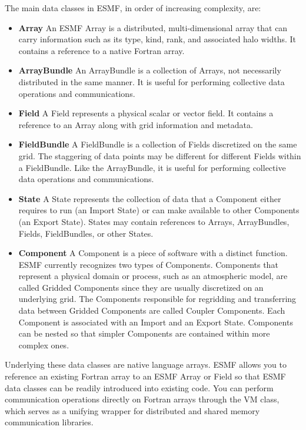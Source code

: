 The main data classes in ESMF, in order of increasing complexity, are:
\begin{itemize}
\item {\bf Array} An ESMF Array is a distributed, multi-dimensional 
array that can carry information such as its type, kind, rank, and 
associated halo widths.  It contains a reference to a native Fortran array.
\item {\bf ArrayBundle}  An ArrayBundle is a collection of Arrays, not
necessarily distributed in the same manner.  It is useful for performing
collective data operations and communications. 
\item {\bf Field}  A Field represents a physical scalar or vector field.
It contains a reference to an Array along with grid information and metadata.
\item {\bf FieldBundle}  A FieldBundle is a collection of Fields discretized 
on the same grid.  The staggering of data points may be different for 
different Fields within a FieldBundle.  Like the ArrayBundle, it is
useful for performing collective data operations and
communications.
\item {\bf State}  A State represents the collection of data that a 
Component either requires to run (an Import State) or can make 
available to other Components (an Export State).
States may contain references to Arrays, ArrayBundles, Fields,
FieldBundles, or other States. 
\item {\bf Component}  A Component is a piece of software 
with a distinct function.  ESMF currently recognizes two types 
of Components.  Components that represent a physical domain 
or process, such 
as an atmospheric model, are called Gridded Components since they are 
usually discretized on an underlying grid.  The Components 
responsible for regridding and transferring data between Gridded 
Components are called Coupler Components.  Each Component
is associated with an Import and an Export State.  Components
can be nested so that simpler Components are contained within more
complex ones.

\end{itemize}

Underlying these data classes are native language arrays.  ESMF allows 
you to reference an existing Fortran array to an ESMF Array or 
Field so that ESMF data classes can be readily 
introduced into existing code.  You can perform communication operations 
directly on Fortran arrays through the VM class, which serves 
as a unifying wrapper for distributed and shared memory communication 
libraries.


